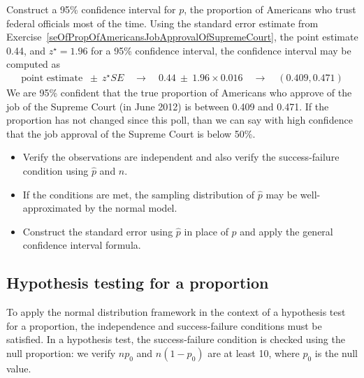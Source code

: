 \begin{example}{Construct a 95\% confidence interval for $p$, the proportion of Americans who trust federal officials most of the time.}
Using the standard error estimate from Exercise~\ref{seOfPropOfAmericansJobApprovalOfSupremeCourt}, the point estimate 0.44, and $z^{\star} = 1.96$ for a 95\% confidence interval, the confidence interval may be computed as
\begin{eqnarray*}
\text{point estimate } \ \pm\ z^{\star}SE \quad\to\quad 0.44 \ \pm\ 1.96\times 0.016 \quad\to\quad (0.409, 0.471)
\end{eqnarray*}
We are 95\% confident that the true proportion of Americans who approve of the job of the Supreme Court (in June 2012) is between 0.409 and 0.471. If the proportion has not changed since this poll, than we can say with high confidence that the job approval of the Supreme Court is below 50\%.


\end{example}

\begin{termBox}{\vspace{-1mm}
\begin{itemize}
\setlength{\itemsep}{0mm}
\item Verify the observations are independent and also verify the success-failure condition using $\hat{p}$ and $n$.
\item If the conditions are met, the sampling distribution of $\hat{p}$ may be well-approximated by the normal model.
\item Construct the standard error using $\hat{p}$ in place of $p$ and apply the general confidence interval formula.\vspace{1mm}
\end{itemize}}
\end{termBox}


\subsection{Hypothesis testing for a proportion}
\label{htForPropSection}

To apply the normal distribution framework in the context of a hypothesis test for a proportion, the independence and success-failure conditions must be satisfied. In a hypothesis test, the success-failure condition is checked using the null proportion: we verify $np_0$ and $n(1-p_0)$ are at least 10, where $p_0$ is the null value.


